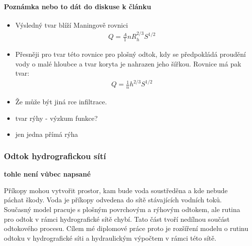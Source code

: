 \paragraph{Poznámka nebo to dát do diskuse k článku} 
\begin{itemize}
\item Výsledný tvar blíží Maningově rovnici
\begin{eqnarray}
Q =\frac A {1}{n} R_{h}^{2/3} S^{1/2}
\end{eqnarray}
\item Přesněji pro tvar této rovnice pro plošný odtok, kdy se předpokládá proudění vody  o malé hloubce a tvar koryta je nahrazen jeho šířkou. Rovnice má pak tvar:
\begin{eqnarray}
Q =\frac {1}{n} h^{2/3} S^{1/2}
\end{eqnarray}
\item Že může být jiná rce infiltrace.
\item tvar rýhy - výzkum funkce?
\item jen jedna přímá rýha
\end{itemize}

\subsubsection{Odtok hydrografickou sítí} \label{sec:tokyodtok}
\textbf{tohle není vůbec napsané}

Příkopy mohou vytvořit prostor, kam bude voda soustředěna a kde nebude páchat škody. Voda je příkopy odvedena do sítě stávajících vodních toků.  Současný model pracuje s plošným povrchovým a rýhovým odtokem, ale rutina pro odtok v rámci hydrografické sítě chybí. Tato část tvoří nedílnou součást odtokového procesu. Cílem mé diplomové práce proto je rozšíření modelu o rutinu odtoku v hydrografické síti a hydraulickým výpočtem v rámci této sítě.
